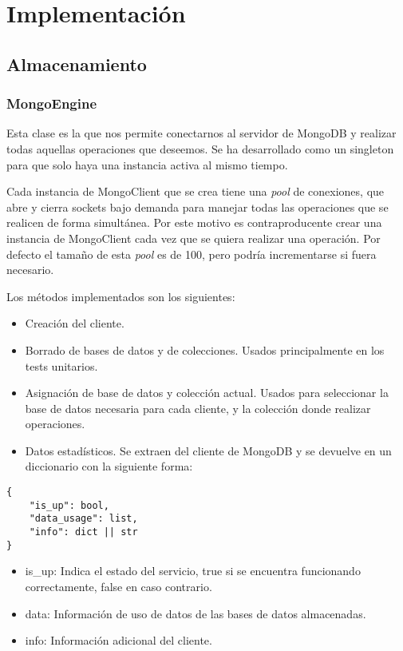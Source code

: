 \chapter{Implementación}



\section{Almacenamiento}

\subsection{MongoEngine}

Esta clase es la que nos permite conectarnos al servidor de MongoDB y realizar todas aquellas operaciones que deseemos. Se ha desarrollado como un singleton para que solo haya una instancia activa al mismo tiempo.

\bigskip
Cada instancia de MongoClient que se crea tiene una \textit{pool} de conexiones, que abre y cierra sockets bajo demanda para manejar todas las operaciones que se realicen de forma simultánea. Por este motivo es contraproducente crear una instancia de MongoClient cada vez que se quiera realizar una operación. Por defecto el tamaño de esta \textit{pool} es de 100, pero podría incrementarse si fuera necesario.

\bigskip
Los métodos implementados son los siguientes:
\begin{itemize}
	\item Creación del cliente.
	\item Borrado de bases de datos y de colecciones. Usados principalmente en los tests unitarios.
	\item Asignación de base de datos y colección actual. Usados para seleccionar la base de datos necesaria para cada cliente, y la colección donde realizar operaciones.
	\item Datos estadísticos. Se extraen del cliente de MongoDB y se devuelve en un diccionario con la siguiente forma:
\end{itemize}
	
\begin{lstlisting}
{
	"is_up": bool,
	"data_usage": list,
	"info": dict || str
}
\end{lstlisting}

\begin{itemize}
	\item is\_up: Indica el estado del servicio, true si se encuentra funcionando correctamente, false en caso contrario.
	\item data: Información de uso de datos de las bases de datos almacenadas.
	\item info: Información adicional del cliente.
\end{itemize}




